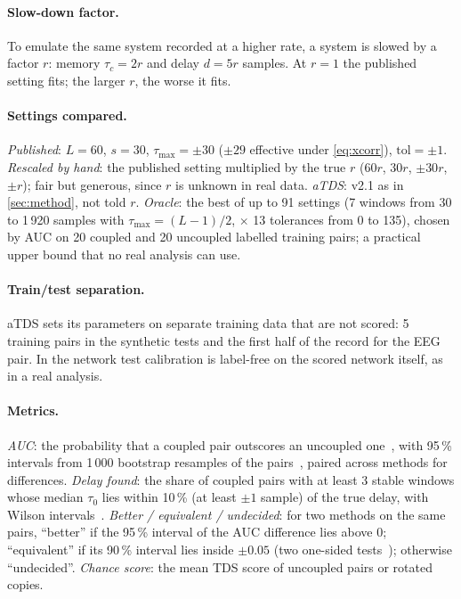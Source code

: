 \documentclass[11pt,a4paper]{article}
\newcommand{\tmax}{\tau_{\max}}
\newcommand{\tol}{\mathrm{tol}}
\begin{document}
\paragraph{Slow-down factor.} To emulate the same system recorded at a higher rate, a system is slowed by a factor $r$: memory $\tau_c = 2r$ and delay $d = 5r$ samples. At $r = 1$ the published setting fits; the larger $r$, the worse it fits.

\paragraph{Settings compared.} \emph{Published}: $L = 60$, $s = 30$, $\tmax = \pm30$ ($\pm29$ effective under \cref{eq:xcorr}), $\tol = \pm1$. \emph{Rescaled by hand}: the published setting multiplied by the true $r$ ($60r$, $30r$, $\pm30r$, $\pm r$); fair but generous, since $r$ is unknown in real data. \emph{aTDS}: v2.1 as in \cref{sec:method}, not told $r$. \emph{Oracle}: the best of up to 91 settings (7 windows from 30 to 1\,920 samples with $\tmax = (L-1)/2$, $\times$ 13 tolerances from 0 to 135), chosen by AUC on 20 coupled and 20 uncoupled labelled training pairs; a practical upper bound that no real analysis can use.

\paragraph{Train/test separation.} aTDS sets its parameters on separate training data that are not scored: 5 training pairs in the synthetic tests and the first half of the record for the EEG pair. In the network test calibration is label-free on the scored network itself, as in a real analysis.

\paragraph{Metrics.} \emph{AUC}: the probability that a coupled pair outscores an uncoupled one~\cite{hanley1982meaning}, with 95\,\% intervals from 1\,000 bootstrap resamples of the pairs~\cite{efron1979bootstrap}, paired across methods for differences. \emph{Delay found}: the share of coupled pairs with at least 3 stable windows whose median $\tau_0$ lies within 10\,\% (at least $\pm1$ sample) of the true delay, with Wilson intervals~\cite{wilson1927probable}. \emph{Better / equivalent / undecided}: for two methods on the same pairs, ``better'' if the 95\,\% interval of the AUC difference lies above 0; ``equivalent'' if its 90\,\% interval lies inside $\pm0.05$ (two one-sided tests~\cite{schuirmann1987comparison}); otherwise ``undecided''. \emph{Chance score}: the mean TDS score of uncoupled pairs or rotated copies.
\end{document}
